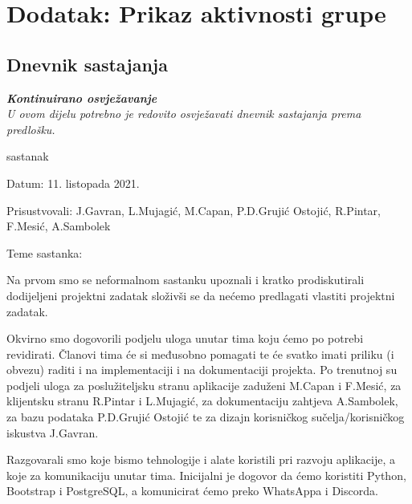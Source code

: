 \chapter*{Dodatak: Prikaz aktivnosti grupe}
		
		\section*{Dnevnik sastajanja}
		
		\textbf{\textit{Kontinuirano osvježavanje}}\\
		
		 \textit{U ovom dijelu potrebno je redovito osvježavati dnevnik sastajanja prema predlošku.}
		
		\begin{packed_enum}
			\item  sastanak
			
			\item[] \begin{packed_item}
				\item Datum: 11. listopada 2021.
				\item Prisustvovali: J.Gavran, L.Mujagić, M.Capan, P.D.Grujić Ostojić, R.Pintar, F.Mesić, A.Sambolek 
				\item Teme sastanka:
				\begin{packed_item}
					\item Na prvom smo se neformalnom sastanku upoznali i kratko prodiskutirali dodijeljeni projektni zadatak složivši se da nećemo predlagati vlastiti projektni zadatak.
					
					\item Okvirno smo dogovorili podjelu uloga unutar tima koju ćemo po potrebi revidirati. Članovi tima će si međusobno pomagati te će svatko imati priliku (i obvezu)
					raditi i na implementaciji i na dokumentaciji projekta. Po trenutnoj su podjeli uloga za poslužiteljsku stranu aplikacije zaduženi M.Capan i F.Mesić, za klijentsku
					stranu R.Pintar i L.Mujagić, za dokumentaciju zahtjeva A.Sambolek, za bazu podataka P.D.Grujić Ostojić te za dizajn korisničkog sučelja/korisničkog iskustva J.Gavran.
					
					\item Razgovarali smo koje bismo tehnologije i alate koristili pri razvoju aplikacije, a koje za komunikaciju unutar tima. Inicijalni je dogovor da ćemo koristiti Python,
					Bootstrap i PostgreSQL, a komunicirat ćemo preko WhatsAppa i Discorda.
				\end{packed_item}
			\end{packed_item}
			

\end{packed_enum}
